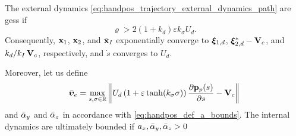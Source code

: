 \begin{prop}
    \label{prop:handpos_trajectory_path_following}
    The external dynamics \eqref{eq:handpos_trajectory_external_dynamics_path} are \glspl{ges} if
    \begin{equation}
        \varrho > 2\left(1 + k_d\right)\varepsilon k_{\sigma} U_d.
    \end{equation}
    Consequently, $\mathbf{x}_1$, $\mathbf{x}_2$, and $\tilde{\mathbf{x}}_I$ exponentially converge to $\bm{\xi}_{1, d}$, $\bm{\xi}_{2, d}^{*} - \mathbf{V}_c$, and $k_d/k_I\,\mathbf{V}_c$, respectively, and $\dot{s}$ converges to $U_d$.

    Moreover, let us define 
    \begin{equation}
        \Bar{\bm{\upsilon}}_e = \max_{s, \sigma \in \mathbb{R}} \left\|
            U_d\left(1 + \varepsilon\tanh(k_{\sigma}\sigma)\right) \frac{\partial \mathbf{p}_p(s)}{\partial s}
            - \mathbf{V}_c\right\|
            \label{eq:handpos_trajectory_LBnu_path}
    \end{equation}
    and $\Bar{\alpha}_y$ and $\Bar{\alpha}_z$ in accordance with \eqref{eq:handpos_def_a_bounds}.
    The internal dynamics are ultimately bounded if $a_x, \Bar{\alpha}_y, \Bar{\alpha}_z > 0$
\end{prop}
